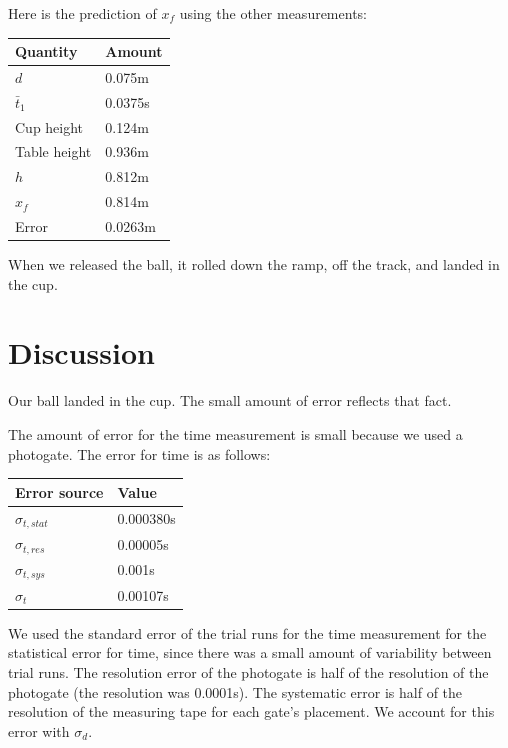 \documentclass[12pt]{article}
\begin{document}
Here is the prediction of \(x_f\) using the other measurements:

\begin{center}
\begin{tabular}{l|l}
\hline
Quantity & Amount\\
\hline
\(d\) & 0.075m\\
\(\bar{t}_{1}\) & 0.0375s\\
Cup height & 0.124m\\
Table height & 0.936m\\
\(h\) & 0.812m\\
\(x_f\) & 0.814m\\
Error & 0.0263m\\
\end{tabular}
\end{center}

When we released the ball, it rolled down the ramp, off the track, and landed in the cup.
\section{Discussion}
\label{sec:org7d1481f}

Our ball landed in the cup. The small amount of error reflects that fact.

The amount of error for the time measurement is small because we used a photogate. The error for time is as follows:

\begin{center}
\begin{tabular}{l|l}
\hline
Error source & Value\\
\hline
\(\sigma_{t,stat}\) & 0.000380s\\
\(\sigma_{t,res}\) & 0.00005s\\
\(\sigma_{t,sys}\) & 0.001s\\
\hline
\(\sigma_t\) & 0.00107s\\
\end{tabular}
\end{center}

We used the standard error of the trial runs for the time measurement for the statistical error for time, since there was a small amount of variability between trial runs. The resolution error of the photogate is half of the resolution of the photogate (the resolution was 0.0001s). The systematic error is half of the resolution of the measuring tape for each gate's placement. We account for this error with \(\sigma_d\).
\end{document}
